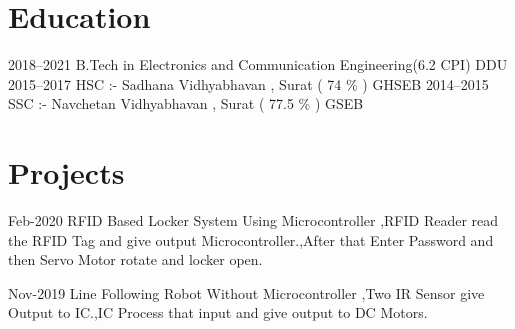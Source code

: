 \documentclass[]{cv-style}          %
\begin{document}
\section{Education}

\begin{entrylist}
\entry
{2018--2021}
{B.Tech {\normalfont in Electronics and Communication Engineering(6.2 CPI)}}
{DDU}
{\vspace{-0.3cm}}
\entry
{2015--2017}
{HSC :- {\normalfont Sadhana Vidhyabhavan , Surat ( 74 \% ) }}
{GHSEB}
{\vspace{-0.3cm}}
\entry
{2014--2015}
{SSC :- {\normalfont Navchetan Vidhyabhavan , Surat ( 77.5 \% )}}
{GSEB}
{}

\end{entrylist}

\section{Projects}


\begin{entrylist}
\entry
{Feb-2020}
{RFID Based Locker System Using Microcontroller}
{\newline\textbullet,RFID Reader read the RFID Tag and give output Microcontroller.\newline\textbullet,After that Enter Password and then Servo Motor rotate and locker open.}
{\vspace{-0.3cm}}
\end{entrylist}


\begin{entrylist}
\entry
{Nov-2019}
{Line Following Robot Without Microcontroller }
{\newline\textbullet,Two IR Sensor give Output to IC.\newline\textbullet,IC Process that input and give output to DC Motors.}
{\vspace{-0.3cm}}
\end{entrylist}



\end{document}
